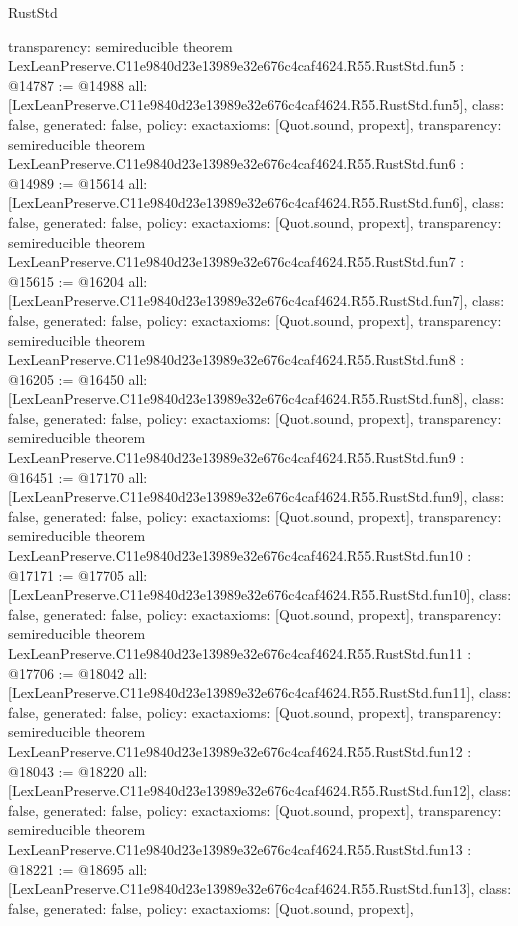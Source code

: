 \begin{lexlean}{RustStd}
\begin{coremodule}
{  transparency: semireducible
}
theorem LexLeanPreserve.C11e9840d23e13989e32e676c4caf4624.R55.RustStd.fun5 : @14787 := @14988 {
  all: [LexLeanPreserve.C11e9840d23e13989e32e676c4caf4624.R55.RustStd.fun5],
  class: false,
  generated: false,
  policy: exact{axioms: [Quot.sound, propext]},
  transparency: semireducible
}
theorem LexLeanPreserve.C11e9840d23e13989e32e676c4caf4624.R55.RustStd.fun6 : @14989 := @15614 {
  all: [LexLeanPreserve.C11e9840d23e13989e32e676c4caf4624.R55.RustStd.fun6],
  class: false,
  generated: false,
  policy: exact{axioms: [Quot.sound, propext]},
  transparency: semireducible
}
theorem LexLeanPreserve.C11e9840d23e13989e32e676c4caf4624.R55.RustStd.fun7 : @15615 := @16204 {
  all: [LexLeanPreserve.C11e9840d23e13989e32e676c4caf4624.R55.RustStd.fun7],
  class: false,
  generated: false,
  policy: exact{axioms: [Quot.sound, propext]},
  transparency: semireducible
}
theorem LexLeanPreserve.C11e9840d23e13989e32e676c4caf4624.R55.RustStd.fun8 : @16205 := @16450 {
  all: [LexLeanPreserve.C11e9840d23e13989e32e676c4caf4624.R55.RustStd.fun8],
  class: false,
  generated: false,
  policy: exact{axioms: [Quot.sound, propext]},
  transparency: semireducible
}
theorem LexLeanPreserve.C11e9840d23e13989e32e676c4caf4624.R55.RustStd.fun9 : @16451 := @17170 {
  all: [LexLeanPreserve.C11e9840d23e13989e32e676c4caf4624.R55.RustStd.fun9],
  class: false,
  generated: false,
  policy: exact{axioms: [Quot.sound, propext]},
  transparency: semireducible
}
theorem LexLeanPreserve.C11e9840d23e13989e32e676c4caf4624.R55.RustStd.fun10 : @17171 := @17705 {
  all: [LexLeanPreserve.C11e9840d23e13989e32e676c4caf4624.R55.RustStd.fun10],
  class: false,
  generated: false,
  policy: exact{axioms: [Quot.sound, propext]},
  transparency: semireducible
}
theorem LexLeanPreserve.C11e9840d23e13989e32e676c4caf4624.R55.RustStd.fun11 : @17706 := @18042 {
  all: [LexLeanPreserve.C11e9840d23e13989e32e676c4caf4624.R55.RustStd.fun11],
  class: false,
  generated: false,
  policy: exact{axioms: [Quot.sound, propext]},
  transparency: semireducible
}
theorem LexLeanPreserve.C11e9840d23e13989e32e676c4caf4624.R55.RustStd.fun12 : @18043 := @18220 {
  all: [LexLeanPreserve.C11e9840d23e13989e32e676c4caf4624.R55.RustStd.fun12],
  class: false,
  generated: false,
  policy: exact{axioms: [Quot.sound, propext]},
  transparency: semireducible
}
theorem LexLeanPreserve.C11e9840d23e13989e32e676c4caf4624.R55.RustStd.fun13 : @18221 := @18695 {
  all: [LexLeanPreserve.C11e9840d23e13989e32e676c4caf4624.R55.RustStd.fun13],
  class: false,
  generated: false,
  policy: exact{axioms: [Quot.sound, propext]},
}
\end{coremodule}
\end{lexlean}

